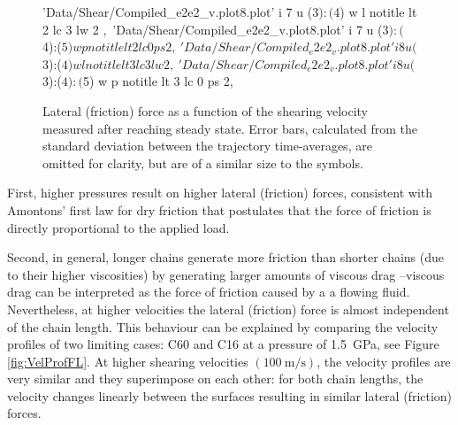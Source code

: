 \documentclass[aps,prb,reprint,superscriptaddress, a4paper]{revtex4-1}
\begin{document}
\begin{figure}
\begin{center}
\begin{gnuplot}[terminal=pdf, terminaloptions={size \SERFigwidth cm, \SERFigheight cm color solid}]
				'Data/Shear/Compiled_e2e2_v.plot8.plot' i 7 u ($3):($4) w l notitle  lt 2 lc 3 lw 2 ,\
				'Data/Shear/Compiled_e2e2_v.plot8.plot' i 7 u ($3):($4):($5) w p notitle  lt 2 lc 0 ps 2,\
				'Data/Shear/Compiled_e2e2_v.plot8.plot' i 8 u ($3):($4) w l notitle  lt 3 lc 3 lw 2 ,\
				'Data/Shear/Compiled_e2e2_v.plot8.plot' i 8 u ($3):($4):($5) w p notitle  lt 3 lc 0 ps 2,\
		\end{gnuplot}
		\caption{Lateral (friction) force as a function of the shearing velocity measured after reaching steady state. Error bars, calculated from the standard deviation between the trajectory time-averages, are omitted for clarity, but are of a similar size to the symbols.}
		\label{fig:FL_v}
	\end{center}
 \end{figure}


First, higher pressures result on higher lateral (friction) forces, consistent with Amontons' first law for dry friction that postulates that the force of friction is directly proportional to the applied load. 

Second, in general, longer chains generate more friction than shorter chains (due to their higher viscosities)  by  generating larger amounts of viscous drag  --viscous drag can be interpreted as the force of friction caused by a a flowing fluid. Nevertheless,  at higher velocities the  lateral (friction) force is almost independent of the chain length. This behaviour can be explained by comparing  the velocity profiles of two limiting cases: C60 and C16 at a pressure of \SI{1.5}{\giga\pascal}, see Figure  \ref{fig:VelProfFL}. At higher shearing velocities  $\left( \SI{100}{\meter\per\second}\right)$, the velocity profiles are very similar and they superimpose on each other: for both chain lengths, the velocity changes linearly   between the surfaces resulting in similar lateral (friction) forces. 
\end{document}
